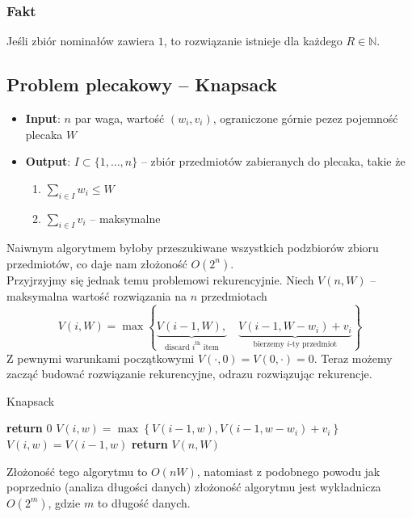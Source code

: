 \documentclass[11pt,a4paper]{article}
\begin{document}
\subsubsection*{Fakt}
Jeśli zbiór nominałów zawiera $1$, to rozwiązanie istnieje dla każdego $R \in \mathbb{N}$.

\subsection{Problem plecakowy -- Knapsack}
\begin{itemize}
    \item \textbf{Input}: $n$ par waga, wartość $(w_i, v_i)$, ograniczone górnie pezez pojemność plecaka $W$
    \item \textbf{Output}: $I \subset \{1,\dots,n\}$ -- zbiór przedmiotów zabieranych do plecaka, takie że
        \begin{enumerate}
            \item $\sum_{i\in I} w_i \leq W$
            \item $\sum_{i\in I} v_i$ -- maksymalne
        \end{enumerate}
\end{itemize}
Naiwnym algorytmem byłoby przeszukiwane wszystkich podzbiorów zbioru przedmiotów, co daje nam złożoność $O(2^n)$.\\
Przyjrzyjmy się jednak temu problemowi rekurencyjnie. Niech $V(n, W)$ -- maksymalna wartość rozwiązania na $n$ przedmiotach
\[
    V(i, W) = \max\left\{ \underbrace{V(i-1, W),}_{\text{discard $i^\text{th}$ item}} \quad \underbrace{V(i-1, W-w_i)+v_i}_{\text{bierzemy $i$-ty przedmiot}} \right\}
\]
Z pewnymi warunkami początkowymi $V(\cdot, 0) = V(0, \cdot ) = 0$. Teraz możemy zacząć budować rozwiązanie rekurencyjne, odrazu rozwiązując rekurencje.\\
\begin{algorithm}
    \caption{Knapsack}
    \begin{algorithmic}[1]
            \State \textbf{return} 0
        \EndIf
                    \State $V(i, w) = \max\left\{V(i-1, w), V(i-1, w-w_i)+v_i\right\}$
                \Else
                    \State $V(i, w) = V(i-1, w)$
                \EndIf
            \EndFor
        \EndFor
        \State \textbf{return} $V(n, W)$
        \EndProcedure
    \end{algorithmic}
\end{algorithm}
Złożoność tego algorytmu to $O(nW)$, natomiast z podobnego powodu jak poprzednio (analiza długości danych) złożoność algorytmu jest wykładnicza $O(2^m)$, gdzie $m$ to długość danych.
\end{document}
